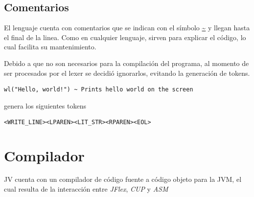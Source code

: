 \documentclass[spanish]{article}
\begin{document}
            \subsection{Comentarios}
                \par El lenguaje cuenta con comentarios que se indican con el símbolo \url{~} y llegan hasta el final de la linea. Como en cualquier lenguaje, sirven para explicar el código, lo cual facilita su mantenimiento.
                \par Debido a que no son necesarios para la compilación del programa, al momento de ser procesados por el lexer se decidió ignorarlos, evitando la generación de tokens.
                \begin{lstlisting}
wl("Hello, world!") ~ Prints hello world on the screen
                \end{lstlisting} 
                genera los siguientes tokens
                \begin{lstlisting}
<WRITE_LINE><LPAREN><LIT_STR><RPAREN><EOL>
                \end{lstlisting}
        \clearpage

    \section{Compilador}
        \par JV cuenta con un compilador de código fuente a código objeto para la JVM, el cual resulta de la interacción entre \textit{JFlex}, \textit{CUP} y \textit{ASM}
\end{document}
